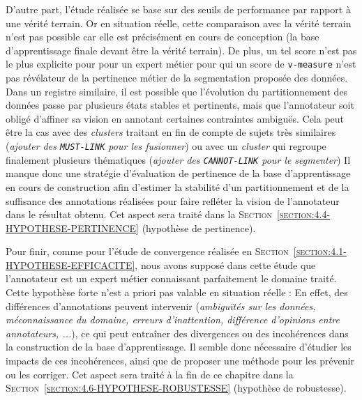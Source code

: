 			D'autre part, l'étude réalisée se base sur des seuils de performance par rapport à une vérité terrain.
			Or en situation réelle, cette comparaison avec la vérité terrain n'est pas possible car elle est précisément en cours de conception (la base d'apprentissage finale devant être la vérité terrain).
			De plus, un tel score n'est pas le plus explicite pour pour un expert métier pour qui un score de \texttt{v-measure} n'est pas révélateur de la pertinence métier de la segmentation proposée des données.
			Dans un registre similaire, il est possible que l'évolution du partitionnement des données passe par plusieurs états stables et pertinents, mais que l'annotateur soit obligé d'affiner sa vision en annotant certaines contraintes ambiguës.
			Cela peut être la cas avec des \textit{clusters} traitant en fin de compte de sujets très similaires (\textit{ajouter des \texttt{MUST-LINK} pour les fusionner}) ou avec un \textit{cluster} qui regroupe finalement plusieurs thématiques (\textit{ajouter des \texttt{CANNOT-LINK} pour le segmenter})
			Il manque donc une stratégie d'évaluation de pertinence de la base d'apprentissage en cours de construction afin d'estimer la stabilité d'un partitionnement et de la suffisance des annotations réalisées pour faire refléter la vision de l'annotateur dans le résultat obtenu.
			Cet aspect sera traité dans la \textsc{Section~\ref{section:4.4-HYPOTHESE-PERTINENCE}} (hypothèse de pertinence).
			
			Pour finir, comme pour l'étude de convergence réalisée en \textsc{Section~\ref{section:4.1-HYPOTHESE-EFFICACITE}}, nous avons supposé dans cette étude que l'annotateur est un expert métier connaissant parfaitement le domaine traité.
			Cette hypothèse forte n'est a priori pas valable en situation réelle : En effet, des différences d'annotations peuvent intervenir (\textit{ambiguïtés sur les données, méconnaissance du domaine, erreurs d'inattention, différence d'opinions entre annotateurs, ...}), ce qui peut entraîner des divergences ou des incohérences dans la construction de la base d'apprentissage.
			Il semble donc nécessaire d'étudier les impacts de ces incohérences, ainsi que de proposer une méthode pour les prévenir ou les corriger.
			Cet aspect sera traité à la fin de ce chapitre dans la \textsc{Section~\ref{section:4.6-HYPOTHESE-ROBUSTESSE}} (hypothèse de robustesse).